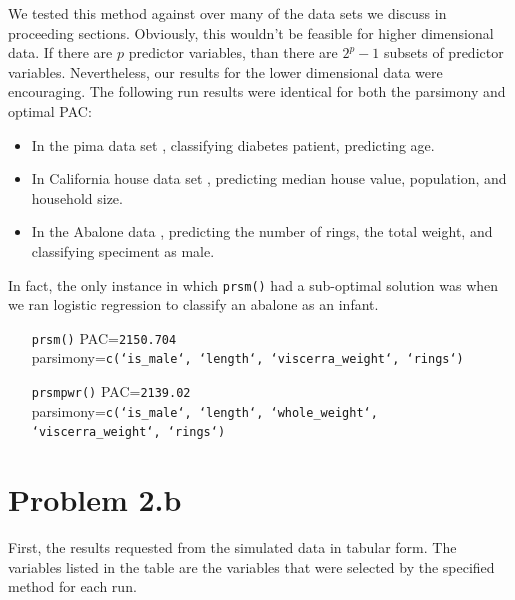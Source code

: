 \documentclass[letter]{article}
\begin{document}
We tested this method against  over many of the data sets we discuss in proceeding
sections. Obviously, this wouldn't be feasible for higher dimensional data. If there are $p$ 
predictor variables, than there are $2^p - 1$ subsets of predictor variables. Nevertheless, our 
results for the lower dimensional data were encouraging. The following run results were identical
for both the parsimony and optimal PAC: 
\begin{itemize}
  \item In the pima data set \cite{pima}, classifying diabetes patient, predicting age. 
  \item In California house data set \cite{cadata}, predicting median house value, population, 
        and household size. 
  \item In the Abalone data \cite{abalone}, predicting the number of rings, the total weight, 
        and classifying speciment as male. 
\end{itemize}
In fact, the only instance in which \texttt{prsm()} had a sub-optimal solution was when we ran 
logistic regression to classify an abalone as an infant. 
\begin{enumerate}
  \item[\texttt{prsm()}] PAC=\texttt{2150.704} \\ parsimony=\texttt{c(`is\_male`, `length`, `viscerra\_weight`, `rings`)}
  \item[\texttt{prsmpwr()}] PAC=\texttt{2139.02} \\  parsimony=\texttt{c(`is\_male`, `length`, `whole\_weight`, `viscerra\_weight`, `rings`)}
\end{enumerate}









\section{Problem 2.b}

First, the results requested from the simulated data in tabular form. The variables listed in the table are the variables that were selected by the specified method for each run.
\end{document}

